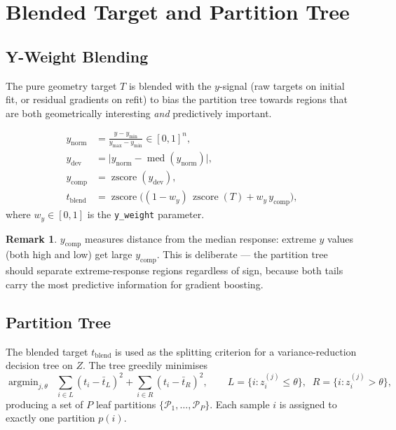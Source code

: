 \documentclass[11pt,a4paper]{article}
\newcommand{\zscore}{\operatorname{zscore}}
\newcommand{\med}{\operatorname{med}}
\DeclareMathOperator*{\argmin}{argmin}
\theoremstyle{definition}
\newtheorem{remark}{Remark}
\begin{document}
\section{Blended Target and Partition Tree}

\subsection{Y-Weight Blending}

The pure geometry target $T$ is blended with the $y$-signal (raw targets on
initial fit, or residual gradients on refit) to bias the partition tree towards
regions that are both geometrically interesting \emph{and} predictively
important.

\begin{align}
    y_{\text{norm}} &= \frac{y - y_{\min}}{y_{\max} - y_{\min}} \in [0,1]^n, \\
    y_{\text{dev}}  &= \bigl|y_{\text{norm}} - \med(y_{\text{norm}})\bigr|, \\
    y_{\text{comp}} &= \zscore(y_{\text{dev}}), \\
    t_{\text{blend}} &= \zscore\!\bigl((1 - w_y)\,\zscore(T) + w_y\,y_{\text{comp}}\bigr),
\end{align}
where $w_y \in [0,1]$ is the \texttt{y\_weight} parameter.

\begin{remark}
$y_{\text{comp}}$ measures distance from the median response: extreme $y$
values (both high and low) get large $y_{\text{comp}}$.  This is deliberate ---
the partition tree should separate extreme-response regions regardless of sign,
because both tails carry the most predictive information for gradient boosting.
\end{remark}

\subsection{Partition Tree}

The blended target $t_{\text{blend}}$ is used as the splitting criterion for a
variance-reduction decision tree on $Z$.  The tree greedily minimises
\begin{equation}
    \argmin_{j, \theta} \;\;
    \sum_{i \in L} (t_i - \bar{t}_L)^2 + \sum_{i \in R} (t_i - \bar{t}_R)^2,
    \qquad
    L = \{i : z_i^{(j)} \le \theta\},\;\; R = \{i : z_i^{(j)} > \theta\},
\end{equation}
producing a set of $P$ leaf partitions $\{\mathcal{P}_1, \dots, \mathcal{P}_P\}$.
Each sample $i$ is assigned to exactly one partition $p(i)$.
\end{document}
